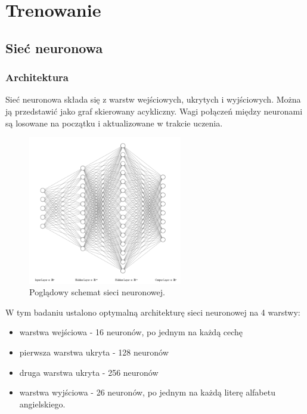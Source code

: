 \section{Trenowanie}\label{sec:trenowanie}
\subsection{Sieć neuronowa}\label{subsec:trenowanie_siec_neuronowa}
\subsubsection{Architektura}\label{subsubsec:architektura_nn}
Sieć neuronowa składa się z warstw wejściowych, ukrytych i wyjściowych. Można ją przedstawić jako graf skierowany acykliczny.
Wagi połączeń między neuronami są losowane na początku i aktualizowane w trakcie uczenia.
\begin{figure}[H]
    \centering
    \includegraphics[width=0.6\textwidth]{img/nn.png}
    \caption{Poglądowy schemat sieci neuronowej.}
    \label{fig:neural_network}
\end{figure}
W tym badaniu ustalono optymalną architekturę sieci neuronowej na 4 warstwy:
\begin{itemize}
    \item warstwa wejściowa - 16 neuronów, po jednym na każdą cechę
    \item pierwsza warstwa ukryta - 128 neuronów
    \item druga warstwa ukryta - 256 neuronów
    \item warstwa wyjściowa - 26 neuronów, po jednym na każdą literę alfabetu angielskiego.
\end{itemize}
